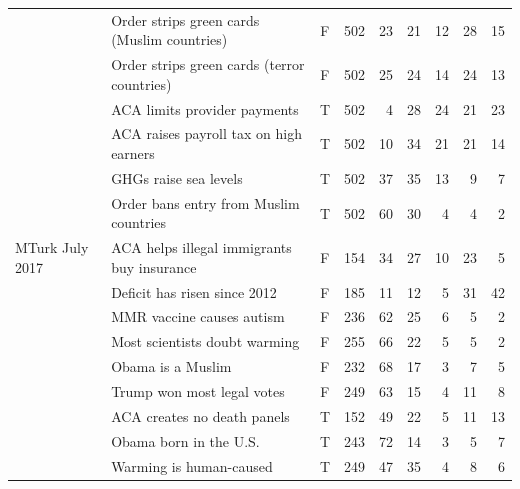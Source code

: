 \begin{tabular}{llcrrrrrr}
 & Order strips green cards (Muslim countries) & F & 502 & 23 & 21 & 12 & 28 & 15 \\
 & Order strips green cards (terror countries) & F & 502 & 25 & 24 & 14 & 24 & 13 \\
 & ACA limits provider payments & T & 502 & 4 & 28 & 24 & 21 & 23 \\
 & ACA raises payroll tax on high earners & T & 502 & 10 & 34 & 21 & 21 & 14 \\
 & GHGs raise sea levels & T & 502 & 37 & 35 & 13 & 9 & 7 \\
 & Order bans entry from Muslim countries & T & 502 & 60 & 30 & 4 & 4 & 2 \\
MTurk July 2017 & ACA helps illegal immigrants buy insurance & F & 154 & 34 & 27 & 10 & 23 & 5 \\
 & Deficit has risen since 2012 & F & 185 & 11 & 12 & 5 & 31 & 42 \\
 & MMR vaccine causes autism & F & 236 & 62 & 25 & 6 & 5 & 2 \\
 & Most scientists doubt warming & F & 255 & 66 & 22 & 5 & 5 & 2 \\
 & Obama is a Muslim & F & 232 & 68 & 17 & 3 & 7 & 5 \\
 & Trump won most legal votes & F & 249 & 63 & 15 & 4 & 11 & 8 \\
 & ACA creates no death panels & T & 152 & 49 & 22 & 5 & 11 & 13 \\
 & Obama born in the U.S. & T & 243 & 72 & 14 & 3 & 5 & 7 \\
 & Warming is human-caused & T & 249 & 47 & 35 & 4 & 8 & 6 \\
\bottomrule
\end{tabular}
